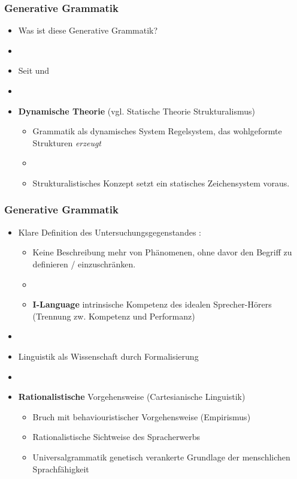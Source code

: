 \begin{frame}
\frametitle{Generative Grammatik}

\begin{itemize}
	\item Was ist diese Generative Grammatik? \citep[vgl.][]{Fries&MyP16c}
	\item[]
	\item Seit \citet{Chomsky57x} und \citet{Chomsky65a}
	\item[]
	\item \textbf{Dynamische Theorie} (vgl. Statische Theorie \ras \zB Strukturalismus)
	\begin{itemize}
		\item Grammatik als dynamisches System \ras Regelsystem, das wohlgeformte Strukturen \emph{erzeugt}
		\item[]
		\item Strukturalistisches Konzept  setzt ein statisches Zeichensystem voraus. 
	\end{itemize}

\end{itemize}

\end{frame}


\begin{frame}
\frametitle{Generative Grammatik}

\begin{itemize}
	\item Klare Definition des Untersuchungsgegenstandes :
	\begin{itemize}
		\item Keine Beschreibung mehr von  Phänomenen, ohne davor den Begriff  zu definieren / einzuschränken.
		\item[]
		\item \textbf{I-Language} \ras intrinsische Kompetenz des idealen Sprecher-Hörers (Trennung zw. Kompetenz und Performanz)
	\end{itemize}
	\item[]
	\item Linguistik als Wissenschaft \ras durch Formalisierung
	\item[]
	\item \textbf{Rationalistische} Vorgehensweise (Cartesianische Linguistik)
	\begin{itemize}
		\item Bruch mit behaviouristischer Vorgehensweise (Empirismus)
		\item Rationalistische Sichtweise des Spracherwerbs
		\item Universalgrammatik \ras genetisch verankerte Grundlage der menschlichen Sprachfähigkeit
	\end{itemize}
\end{itemize}

\nocite{Fries&MyP16d}

\end{frame}


